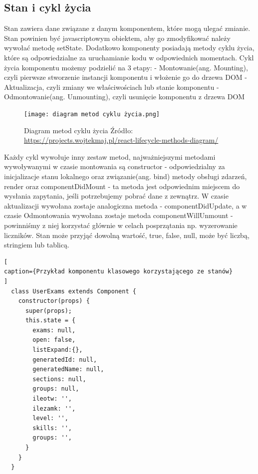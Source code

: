 \documentclass[oneside,polski,logo,indent]{amuthesis}
\begin{document}
\begin{enumerate}
\begin{enumerate}
{}

\subsection{Stan i cykl życia}{

Stan zawiera dane związane z danym komponentem, które mogą ulegać zmianie. Stan powinien być javascriptowym obiektem, aby go zmodyfikować należy wywołać metodę setState. Dodatkowo komponenty posiadają metody cyklu życia, które są odpowiedzialne za uruchamianie kodu w odpowiednich momentach.
\newline
Cykl życia komponentu możemy podzielić na 3 etapy:
\newline- Montowanie(ang. Mounting), czyli pierwsze stworzenie instancji komponentu i włożenie go do drzewa DOM
\newline- Aktualizacja, czyli zmiany we właściwościach lub stanie komponentu
\newline- Odmontowanie(ang. Unmounting), czyli usunięcie komponentu z drzewa DOM
\begin{figure}[H]
\centering
\texttt{[image: diagram metod cyklu życia.png]}
\caption{Diagram metod cyklu życia
\newline
Źródło: \url{https://projects.wojtekmaj.pl/react-lifecycle-methods-diagram/}
}
\label{metody cyklu zycia}
\end{figure}
Każdy cykl wywołuje inny zestaw metod, najważniejszymi metodami wywoływanymi w czasie montowania są constructor - odpowiedzialny za inicjalizacje stanu lokalnego oraz związanie(ang. bind) metody obsługi zdarzeń, render oraz componentDidMount - ta metoda jest odpowiednim miejscem do wysłania zapytania, jeśli potrzebujemy pobrać dane z zewnątrz.
W czasie aktualizacji wywołana zostaje analogiczna metoda - componentDidUpdate, a w czasie Odmontowania wywołana zostaje metoda componentWillUnmount - powinniśmy z niej korzystać głównie w celach posprzątania np. wyzerowanie liczników.
\newline
\newline
Stan może przyjąć dowolną wartość, true, false, null, może być liczbą, stringiem lub tablicą.

\begin{lstlisting}[
caption={Przykład komponentu klasowego korzystającego ze stanów}
]
  class UserExams extends Component {
    constructor(props) {
      super(props);
      this.state = {
        exams: null,
        open: false,
        listExpand:{},
        generatedId: null,
        generatedName: null,
        sections: null,
        groups: null,
        ileotw: '',
        ilezamk: '',
        level: '',
        skills: '', 
        groups: '',
      }
    }
  }


\end{lstlisting}}
\end{enumerate}
\end{enumerate}
\end{document}

